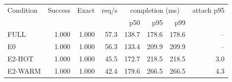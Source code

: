 \begin{tabular}{lrrrrrrr}
\toprule
Condition & Success & Exact & req/s & \multicolumn{3}{c}{completion (ms)} & attach p95 \\
 &  &  &  & p50 & p95 & p99 &  \\
\midrule
FULL & 1.000 & 1.000 & 57.3 & 138.7 & 178.6 & 178.6 & -- \\
E0 & 1.000 & 1.000 & 56.3 & 133.4 & 209.9 & 209.9 & -- \\
E2-HOT & 1.000 & 1.000 & 45.5 & 172.7 & 218.5 & 218.5 & 3.0 \\
E2-WARM & 1.000 & 1.000 & 42.4 & 179.6 & 266.5 & 266.5 & 4.3 \\
\bottomrule
\end{tabular}
